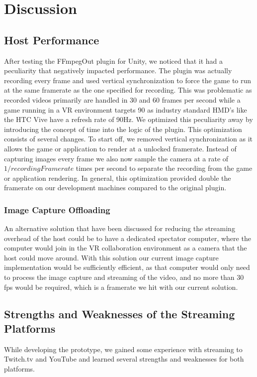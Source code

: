 \section{Discussion}
\subsection{Host Performance}
After testing the FFmpegOut plugin for Unity, we noticed that it had a peculiarity that negatively impacted performance. The plugin was actually recording every frame and used vertical synchronization to force the game to run at the same framerate as the one specified for recording. This was problematic as recorded videos primarily are handled in 30 and 60 frames per second while a game running in a VR environment targets 90 as industry standard HMD's like the HTC Vive have a refresh rate of 90Hz\cite{vive_specs}. We optimized this peculiarity away by introducing the concept of time into the logic of the plugin. This optimization consists of several changes. To start off, we removed vertical synchronization as it allows the game or application to render at a unlocked framerate. Instead of capturing images every frame we also now sample the camera at a rate of $1/recordingFramerate$ times per second to separate the recording from the game or application rendering. In general, this optimization provided double the framerate on our development machines compared to the original plugin.  

\subsubsection{Image Capture Offloading}
An alternative solution that have been discussed for reducing the streaming overhead of the host could be to have a dedicated spectator computer, where the computer would join in the VR collaboration environment as a camera that the host could move around. With this solution our current image capture implementation would be sufficiently efficient, as that computer would only need to process the image capture and streaming of the video, and no more than 30 fps would be required, which is a framerate we hit with our current solution.
    
\subsection{Strengths and Weaknesses of the Streaming Platforms}
While developing the prototype, we gained some experience with streaming to Twitch.tv and YouTube and learned several strengths and weaknesses for both platforms.

